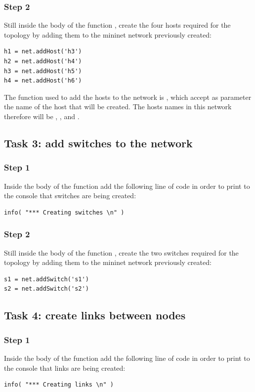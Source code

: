 \subsubsection*{Step 2}
Still inside the body of the function , create the
four hosts required for the topology by adding them to the mininet network
previously created:
\begin{lstlisting}
h1 = net.addHost('h3')
h2 = net.addHost('h4')
h3 = net.addHost('h5')
h4 = net.addHost('h6')
\end{lstlisting}
The function used to add the hosts to the network is , which
accept as parameter the name of the host that will be created. The hosts names in
this network therefore will be , ,  and .





\subsection*{Task 3: add switches to the network}
\subsubsection*{Step 1}
Inside the body of the function  add the following line
of code in order to print to the console that switches are being created:
\begin{lstlisting}
info( "*** Creating switches \n" )
\end{lstlisting}

\subsubsection*{Step 2}
Still inside the body of the function , create the
two switches required for the topology by adding them to the mininet network
previously created:
\begin{lstlisting}
s1 = net.addSwitch('s1')
s2 = net.addSwitch('s2')
\end{lstlisting}







\subsection*{Task 4: create links between nodes}
\subsubsection*{Step 1}
Inside the body of the function  add the following line
of code in order to print to the console that links are being created:
\begin{lstlisting}
info( "*** Creating links \n" )
\end{lstlisting}

